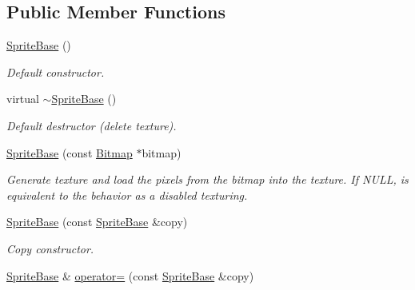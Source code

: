 \subsection*{Public Member Functions}
\begin{DoxyCompactItemize}
\item 
\hypertarget{class_f2_c_1_1_sprite_base_afbb00eac253f057d3ad63a2ac5cec749}{
\hyperlink{class_f2_c_1_1_sprite_base_afbb00eac253f057d3ad63a2ac5cec749}{SpriteBase} ()}
\label{class_f2_c_1_1_sprite_base_afbb00eac253f057d3ad63a2ac5cec749}

\begin{DoxyCompactList}\small\item\em Default constructor. \item\end{DoxyCompactList}\item 
\hypertarget{class_f2_c_1_1_sprite_base_a283941cc4bae11af8819212baedbc73d}{
virtual \hyperlink{class_f2_c_1_1_sprite_base_a283941cc4bae11af8819212baedbc73d}{$\sim$SpriteBase} ()}
\label{class_f2_c_1_1_sprite_base_a283941cc4bae11af8819212baedbc73d}

\begin{DoxyCompactList}\small\item\em Default destructor (delete texture). \item\end{DoxyCompactList}\item 
\hyperlink{class_f2_c_1_1_sprite_base_aa00534841b3adc48e992e2282ec6963f}{SpriteBase} (const \hyperlink{class_f2_c_1_1_bitmap}{Bitmap} $\ast$bitmap)
\begin{DoxyCompactList}\small\item\em Generate texture and load the pixels from the bitmap into the texture. If NULL, is equivalent to the behavior as a disabled texturing. \item\end{DoxyCompactList}\item 
\hypertarget{class_f2_c_1_1_sprite_base_a67e2731423751d23e05db92457ab7afe}{
\hyperlink{class_f2_c_1_1_sprite_base_a67e2731423751d23e05db92457ab7afe}{SpriteBase} (const \hyperlink{class_f2_c_1_1_sprite_base}{SpriteBase} \&copy)}
\label{class_f2_c_1_1_sprite_base_a67e2731423751d23e05db92457ab7afe}

\begin{DoxyCompactList}\small\item\em Copy constructor. \item\end{DoxyCompactList}\item 
\hypertarget{class_f2_c_1_1_sprite_base_af56c5ea473d444f4c8b65bd51d7fd724}{
\hyperlink{class_f2_c_1_1_sprite_base}{SpriteBase} \& \hyperlink{class_f2_c_1_1_sprite_base_af56c5ea473d444f4c8b65bd51d7fd724}{operator=} (const \hyperlink{class_f2_c_1_1_sprite_base}{SpriteBase} \&copy)}
\label{class_f2_c_1_1_sprite_base_af56c5ea473d444f4c8b65bd51d7fd724}


\end{DoxyCompactItemize}
